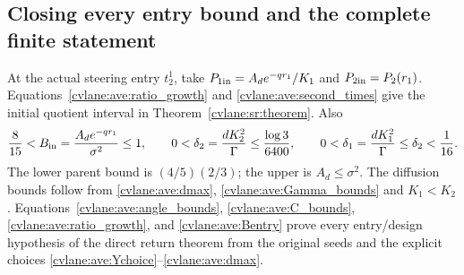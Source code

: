 \subsection{Closing every entry bound and the complete finite statement}

At the actual steering entry $t_2^1$, take
$P_{1\rm in}=A_de^{-qr_1}/K_1$ and
$P_{2\rm in}=P_2(r_1)$. Equations~\eqref{cvlane:ave:ratio_growth} and
\eqref{cvlane:ave:second_times} give the initial quotient interval in
Theorem~\ref{cvlane:sr:theorem}. Also
\begin{equation}\label{cvlane:ave:Bentry}
 \frac{8}{15}<B_{\rm in}
 =\frac{A_de^{-qr_1}}{\sigma^2}\leq1,
 \qquad
 0<\delta_2=\frac{dK_2^2}{\Gamma}\leq\frac{\log3}{6400},
 \qquad 0<\delta_1=\frac{dK_1^2}{\Gamma}
       \leq\delta_2<\frac1{16}.
\end{equation}
The lower parent bound is $(4/5)(2/3)$; the upper is
$A_d\leq\sigma^2$. The diffusion bounds follow from
\eqref{cvlane:ave:dmax}, \eqref{cvlane:ave:Gamma_bounds} and $K_1<K_2$.
Equations~\eqref{cvlane:ave:angle_bounds}, \eqref{cvlane:ave:C_bounds},
\eqref{cvlane:ave:ratio_growth}, and \eqref{cvlane:ave:Bentry} prove every
entry/design hypothesis of the direct return theorem from the original
seeds and the explicit choices \eqref{cvlane:ave:Ychoice}--\eqref{cvlane:ave:dmax}.

